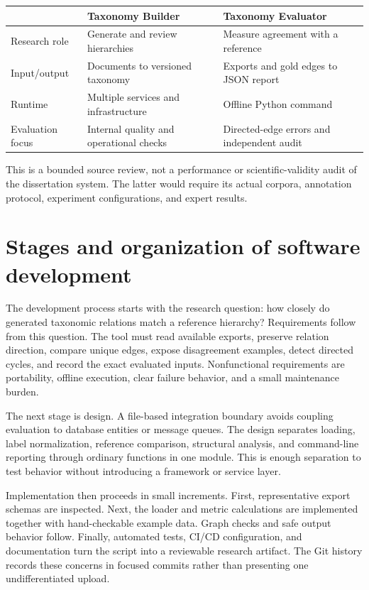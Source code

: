 \documentclass[12pt,a4paper]{article}
\begin{document}
\noindent\begin{tabularx}{\textwidth}{|p{3.5cm}|X|X|}\hline
 & \textbf{Taxonomy Builder} & \textbf{Taxonomy Evaluator} \\\hline
Research role & Generate and review hierarchies & Measure agreement with a reference \\\hline
Input/output & Documents to versioned taxonomy & Exports and gold edges to JSON report \\\hline
Runtime & Multiple services and infrastructure & Offline Python command \\\hline
Evaluation focus & Internal quality and operational checks & Directed-edge errors and independent audit \\\hline
\end{tabularx}

This is a bounded source review, not a performance or scientific-validity audit of the dissertation system. The latter would require its actual corpora, annotation protocol, experiment configurations, and expert results.

\clearpage
\section{Stages and organization of software development}
The development process starts with the research question: how closely do generated taxonomic relations match a reference hierarchy? Requirements follow from this question. The tool must read available exports, preserve relation direction, compare unique edges, expose disagreement examples, detect directed cycles, and record the exact evaluated inputs. Nonfunctional requirements are portability, offline execution, clear failure behavior, and a small maintenance burden.

The next stage is design. A file-based integration boundary avoids coupling evaluation to database entities or message queues. The design separates loading, label normalization, reference comparison, structural analysis, and command-line reporting through ordinary functions in one module. This is enough separation to test behavior without introducing a framework or service layer.

Implementation then proceeds in small increments. First, representative export schemas are inspected. Next, the loader and metric calculations are implemented together with hand-checkable example data. Graph checks and safe output behavior follow. Finally, automated tests, CI/CD configuration, and documentation turn the script into a reviewable research artifact. The Git history records these concerns in focused commits rather than presenting one undifferentiated upload.
\end{document}
